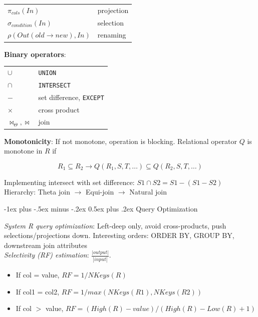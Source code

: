 \documentclass[10pt,landscape]{article}
\makeatletter
\renewcommand{\section}{\@startsection{section}{1}{0mm}%
                                {-1ex plus -.5ex minus -.2ex}%
                                {0.5ex plus .2ex}%
                                {\normalfont\large\bfseries}}
\makeatother
\begin{document}
\begin{multicols}{3}
\begin{tabular}{@{}ll@{}}
$\pi_{cols}(In)$                        & projection \\
$\sigma_{condition}(In)$                & selection \\
$\rho(Out(old \rightarrow new), In)$    & renaming
\end{tabular}

\textbf{Binary operators}:

\begin{tabular}{@{}ll@{}}
$\cup$                      & \texttt{UNION} \\
$\cap$                      & \texttt{INTERSECT} \\
$-$                         & set difference, \texttt{EXCEPT} \\
$\times$                    & cross product \\
$\bowtie_\Theta, \bowtie$   & join
\end{tabular}

\textbf{Monotonicity}: If not monotone, operation is blocking. Relational operator $Q$ is monotone in $R$ if

\begin{equation}
    R_1 \subseteq R_2 \rightarrow Q(R_1, S, T, \ldots) \subseteq Q(R_2, S, T, \ldots)
\end{equation}

Implementing intersect with set difference: $S1 \cap S2  = S1 - (S1 - S2)$ \\
Hierarchy: Theta join $\rightarrow$ Equi-join $\rightarrow$ Natural join


\section{Query Optimization}

\textit{System R query optimization}: Left-deep only, avoid cross-products, push selections/projections down. Interesting orders: ORDER BY, GROUP BY, downstream join attributes \\
\textit{Selectivity (RF) estimation}: $\frac{|output|}{|input|}$.

\begin{itemize}
  \item If col = value, $RF = 1 / NKeys(R)$
  \item If col1 = col2, $RF = 1 / max(NKeys(R1), NKeys(R2))$
  \item If col $>$ value, $RF = (High(R)-value) / (High(R) - Low(R) + 1)$
\end{itemize}


\end{multicols}
\end{document}
